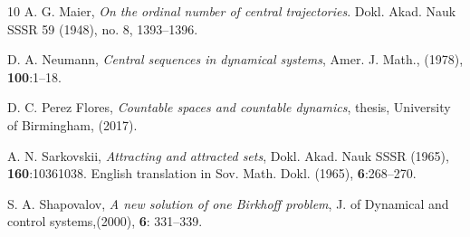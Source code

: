 \documentclass[12pt]{amsart}
\numberwithin{equation}{section}
\begin{document}
\begin{thebibliography}{10}
A. G. Maier, \emph{On the ordinal number of central trajectories}. Dokl. Akad.
Nauk SSSR 59 (1948),  no. 8, 1393--1396.
\vspace{.25cm}

D. A. Neumann, \emph{Central sequences in dynamical systems}, Amer. J. Math.,  (1978), \textbf{100}:1--18.
\vspace{.25cm}

D. C. Perez Flores, \emph{Countable spaces and countable dynamics}, thesis, University of Birmingham, (2017).
\vspace{.25cm}

A. N. Sarkovskii, \emph{Attracting and attracted sets}, Dokl. Akad. Nauk SSSR (1965),
\textbf{160}:10361038. English translation in Sov. Math. Dokl. (1965), \textbf{6}:268--270.
\vspace{.25cm}

S. A. Shapovalov, \emph{A new solution of one Birkhoff problem}, J. of Dynamical and control systems,(2000),  \textbf{6}: 331--339.

\end{thebibliography}
\end{document}
